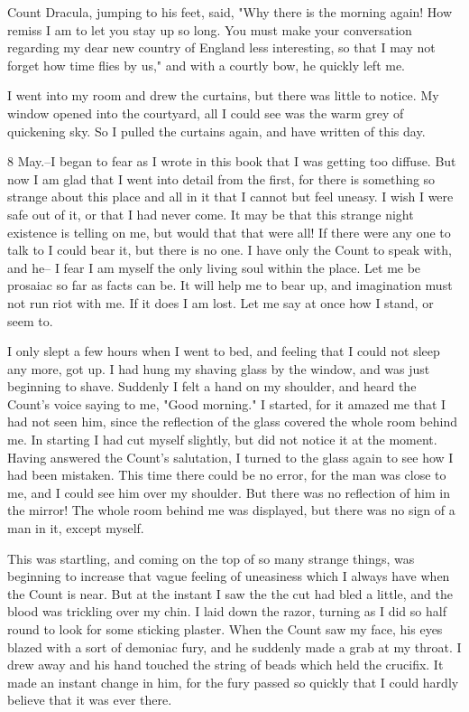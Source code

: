 Count Dracula, jumping to his feet, said, "Why there is the morning again! How remiss I am to let you stay up so long. You must make your conversation regarding my dear new country of England less interesting, so that I may not forget how time flies by us," and with a courtly bow, he quickly left me. 

I went into my room and drew the curtains, but there was little to notice. My window opened into the courtyard, all I could see was the warm grey of quickening sky. So I pulled the curtains again, and have written of this day. 

8 May.--I began to fear as I wrote in this book that I was getting too diffuse. But now I am glad that I went into detail from the first, for there is something so strange about this place and all in it that I cannot but feel uneasy. I wish I were safe out of it, or that I had never come. It may be that this strange night existence is telling on me, but would that that were all! If there were any one to talk to I could bear it, but there is no one. I have only the Count to speak with, and he-- I fear I am myself the only living soul within the place. Let me be prosaiac so far as facts can be. It will help me to bear up, and imagination must not run riot with me. If it does I am lost. Let me say at once how I stand, or seem to. 

I only slept a few hours when I went to bed, and feeling that I could not sleep any more, got up. I had hung my shaving glass by the window, and was just beginning to shave. Suddenly I felt a hand on my shoulder, and heard the Count's voice saying to me, "Good morning." I started, for it amazed me that I had not seen him, since the reflection of the glass covered the whole room behind me. In starting I had cut myself slightly, but did not notice it at the moment. Having answered the Count's salutation, I turned to the glass again to see how I had been mistaken. This time there could be no error, for the man was close to me, and I could see him over my shoulder. But there was no reflection of him in the mirror! The whole room behind me was displayed, but there was no sign of a man in it, except myself. 

This was startling, and coming on the top of so many strange things, was beginning to increase that vague feeling of uneasiness which I always have when the Count is near. But at the instant I saw the the cut had bled a little, and the blood was trickling over my chin. I laid down the razor, turning as I did so half round to look for some sticking plaster. When the Count saw my face, his eyes blazed with a sort of demoniac fury, and he suddenly made a grab at my throat. I drew away and his hand touched the string of beads which held the crucifix. It made an instant change in him, for the fury passed so quickly that I could hardly believe that it was ever there. 

